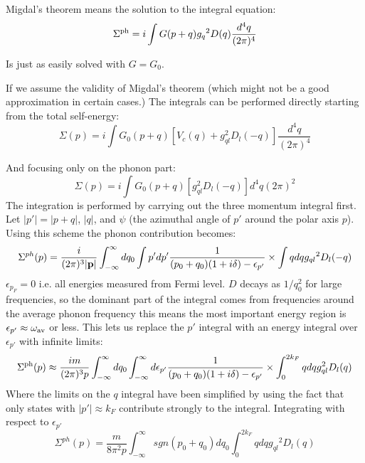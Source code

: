 Migdal's theorem means the solution to the integral equation:
\begin{equation}
\Sigma^{\rm ph} = i \int G(p+q){g_{q}}^{2}D(q)\frac{d^{4}q}{(2\pi)^{4}}
\end{equation}

Is just as easily solved with $G=G_{0}$.

If we assume the validity of Migdal's theorem (which might not be a good approximation in certain cases.)
The integrals can be performed directly starting from the total self-energy:
%
\begin{equation}
\Sigma(p) = i\int G_{0}(p+q)[V_{c}(q) + g^{2}_{ql}D_{l}(-q)]\frac{d^{4}q}{(2\pi)^{4}}
\end{equation}
%

And focusing only on the phonon part:
%
\begin{equation}
\Sigma(p) = i\int G_{0}(p+q)[g^{2}_{ql}D_{l}(-q)]{d^{4}q}{(2\pi)^{2}}
\end{equation}
%
The integration is performed by carrying out the three momentum integral first.
Let $|p'| = |p+q|$, $|q|$, and $\psi$ (the azimuthal angle of $p'$ around the polar
axis $p$). Using this scheme the phonon contribution becomes:
%
\begin{equation}
\Sigma^{ph}(p) = \frac{i}{(2\pi)^{3}|{\bf p}|}\int_{-\infty}^{\infty}dq_{0}\int p' dp' \frac{1}{(p_0+q_0)(1+i\delta)-\epsilon_{p'}}\times\int q dq {g_{ql}}^{2}D_{l}(-q) 
\end{equation}
%
$\epsilon_{p_{F}}=0$ i.e. all energies measured from Fermi level.  $D$ decays as $1/q^{2}_0$ for large frequencies,
so the dominant part of the integral comes from frequencies around the average phonon frequency this means
the most important energy region is $\epsilon_{p'}\approx \omega_{\rm av}$ or less. This lets us replace
the $p'$ integral with an energy integral over $\epsilon_{p'}$ with infinite limits:
%
\begin{equation}
\Sigma^{\rm ph}(p) \approx \frac{im}{(2\pi)^{3}p} \int_{-\infty}^{\infty} dq_{0} \int_{-\infty}^{\infty}d \epsilon_{p'}
\frac{1}{(p_0+q_0)(1 + i\delta)-\epsilon_{p'}}\times\int_{0}^{2k_{F}}qdq{g_{ql}^{2}}D_{l}(q)
\end{equation}
%
Where the limits on the $q$ integral have been simplified by using the fact that 
only states with $|p'|\approx k_{F}$ contribute strongly to the integral. Integrating
with respect to $\epsilon_{p'}$
%
\begin{equation}
\label{eq:migseq}
\Sigma^{ph} (p) = \frac{m}{8\pi^{2}p}\int_{-\infty}^{\infty} sgn(p_0+q_0)dq_{0}\int_{0}^{2k_{F}}q dq {g_{ql}}^{2}D_{l}(q)
\end{equation}
